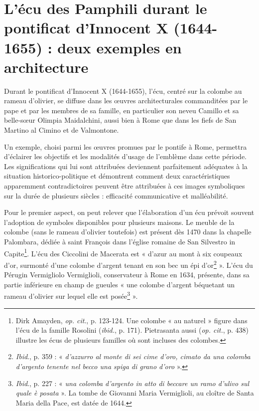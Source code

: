 \documentclass[12pt,twoside,openany]{book}
\begin{document}
\section{L’écu des Pamphili durant le pontificat d’Innocent X (1644-1655) : deux exemples en architecture}

Durant le pontificat d’Innocent X (1644-1655), l’écu, centré sur la colombe au rameau d’olivier, se diffuse dans les œuvres architecturales commanditées par le pape et par les membres de sa famille, en particulier son neveu Camillo et sa belle-sœur Olimpia Maidalchini, aussi bien à Rome que dans les fiefs de San Martino al Cimino et de Valmontone.

Un exemple, choisi parmi les œuvres promues par le pontife à Rome, permettra d’éclairer les objectifs et les modalités d’usage de l’emblème dans cette période. Les significations qui lui sont attribuées deviennent parfaitement adéquates à la situation historico-politique et démontrent comment deux caractéristiques apparemment contradictoires peuvent être attribuées à ces images symboliques sur la durée de plusieurs siècles : efficacité communicative et malléabilité.

Pour le premier aspect, on peut relever que l’élaboration d’un écu prévoit souvent l’adoption de symboles disponibles pour plusieurs maisons. Le meuble de la colombe (sans le rameau d’olivier toutefois) est présent dès 1470 dans la chapelle Palombara, dédiée à saint François dans l’église romaine de San Silvestro in Capite\footnote{Dirk Amayden, \textit{op. cit}., p. 123-124. Une colombe « au naturel » figure dans l’écu de la famille Rosolini (\textit{ibid.}, p. 171). Pietrasanta aussi (\textit{op. cit.}, p. 438) illustre les écus de plusieurs familles où sont incluses des colombes.}. L’écu des Ciccolini de Macerata est « d’azur au mont à six coupeaux d’or, surmonté d’une colombe d’argent tenant en son bec un épi d’or\footnote{\textit{Ibid}., p. 359 : « \textit{d’azzurro al monte di sei cime d’oro, cimato da una colomba d’argento tenente nel becco una spiga di grano d’oro} ».} ». L’écu du Pérugin Vermigliolo Vermiglioli, conservateur à Rome en 1634, présente, dans sa partie inférieure en champ de gueules « une colombe d’argent béquetant un rameau d’olivier sur lequel elle est posée\footnote{\textit{Ibid}., p. 227 : « \textit{una colomba d’argento in atto di beccare un ramo d’ulivo sul quale è posata }». La tombe de Giovanni Maria Vermiglioli, au cloître de Santa Maria della Pace, est datée de 1644.} ».
\end{document}
